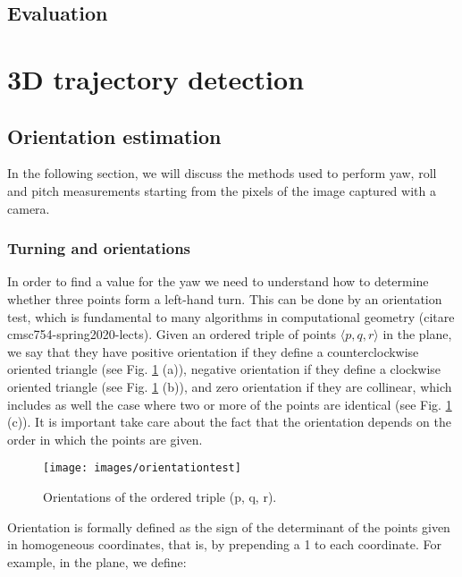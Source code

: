 \subsection{Evaluation}
\label{sec:evaluation}

\section{3D trajectory detection}
\label{sec:3dtraj}

\subsection{Orientation estimation}
\label{sec:orientationestimation}
In the following section, we will discuss the methods used to perform yaw, roll and pitch measurements starting from the pixels of the image captured with a camera.

\subsubsection{Turning and orientations}
\label{subsec:orientationtest}
In order to find a value for the yaw we need to understand how to determine whether three points form a left-hand turn. This can be done by an orientation test, which is fundamental to many algorithms in computational geometry (citare cmsc754-spring2020-lects). Given an ordered triple of points $\langle p, q, r \rangle$ in the plane, we say that they have positive orientation if they define a counterclockwise oriented triangle (see Fig. \ref{fig:orientationtest} (a)), negative orientation if they define a clockwise oriented triangle (see Fig. \ref{fig:orientationtest} (b)), and zero orientation if they are collinear, which includes as well the case where two or more of the points are identical (see Fig. \ref{fig:orientationtest} (c)). It is important take care about the fact that the orientation depends on the order in which the points are given.

\begin{figure}[H]
	\centering
	\texttt{[image: images/orientationtest]}
	\caption[Orientation test.]{Orientations of the ordered triple (p, q, r).}
	\label{fig:orientationtest}
\end{figure}

\noindent Orientation is formally defined as the sign of the determinant of the points given in homogeneous coordinates, that is, by prepending a 1 to each coordinate. For example, in the plane, we define:


